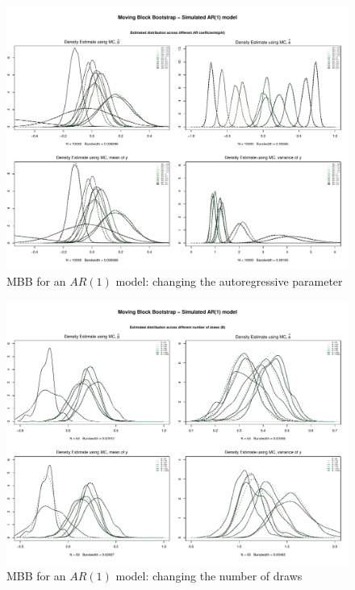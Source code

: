 \documentclass{article}
\begin{document}
\begin{figure}[hbt!]
\includegraphics[width=\textwidth]{plots/MBB_AR1_densities_diff_ARq}
\caption{MBB for an $AR(1)$ model: changing the autoregressive parameter}
\label{fig:MBB_AR1_densities_diff_ARq}
\centering
\end{figure}

\begin{figure}[hbt!]
\includegraphics[width=\textwidth]{plots/MBB_AR1_densities_diff_drawsB}
\caption{MBB for an $AR(1)$ model: changing the number of draws}
\label{fig:MBB_AR1_densities_diff_drawsB}
\centering
\end{figure}
\end{document}
